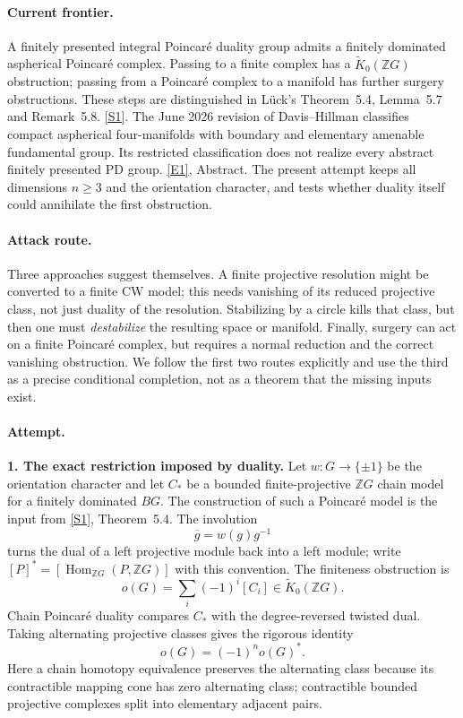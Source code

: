 \documentclass[11pt,a4paper]{article}
\newcommand{\Z}{\mathbb{Z}}
\newcommand{\sref}[2]{\hyperlink{source:#1:#2}{[S#2]}}
\newcommand{\eref}[2]{\hyperlink{extra:#1:#2}{[E#2]}}
\numberwithin{equation}{section}
\begin{document}
\paragraph{Current frontier.}
A finitely presented integral Poincar\'e duality group admits a finitely
dominated aspherical Poincar\'e complex. Passing to a finite complex has a
$\widetilde K_0(\Z G)$ obstruction; passing from a Poincar\'e complex to a
manifold has further surgery obstructions. These steps are distinguished
in L\"uck's Theorem~5.4, Lemma~5.7 and Remark~5.8.
\sref{statement}{1}. The June 2026 revision of Davis--Hillman classifies
compact aspherical four-manifolds with boundary and elementary amenable
fundamental group. Its restricted classification does not realize every
abstract finitely presented PD group. \eref{statement}{1}, Abstract.
The present attempt keeps all dimensions $n\ge3$ and the orientation
character, and tests whether duality itself could annihilate the first
obstruction.

\paragraph{Attack route.}
Three approaches suggest themselves. A finite projective resolution might
be converted to a finite CW model; this needs vanishing of its reduced
projective class, not just duality of the resolution. Stabilizing by a
circle kills that class, but then one must \emph{destabilize} the resulting
space or manifold. Finally, surgery can act on a finite Poincar\'e complex,
but requires a normal reduction and the correct vanishing obstruction.
We follow the first two routes explicitly and use the third as a precise
conditional completion, not as a theorem that the missing inputs exist.

\paragraph{Attempt.}
\textbf{1. The exact restriction imposed by duality.}
Let $w:G\to\{\pm1\}$ be the orientation character and let
$C_*$ be a bounded finite-projective $\Z G$ chain model for a finitely
dominated $BG$. The construction of such a Poincar\'e model is the input
from \sref{statement}{1}, Theorem~5.4. The involution
\[
 \overline g=w(g)g^{-1}
\]
turns the dual of a left projective module back into a left module; write
$[P]^*=[\operatorname{Hom}_{\Z G}(P,\Z G)]$ with this convention.
The finiteness obstruction is
\[
 o(G)=\sum_i(-1)^i[C_i]\in\widetilde K_0(\Z G).
\]
Chain Poincar\'e duality compares $C_*$ with the degree-reversed twisted
dual. Taking alternating projective classes gives the rigorous identity
\begin{equation}\label{statement:selfdual}
 o(G)=(-1)^n o(G)^*.
\end{equation}
Here a chain homotopy equivalence preserves the alternating class because
its contractible mapping cone has zero alternating class; contractible
bounded projective complexes split into elementary adjacent pairs.
\end{document}
